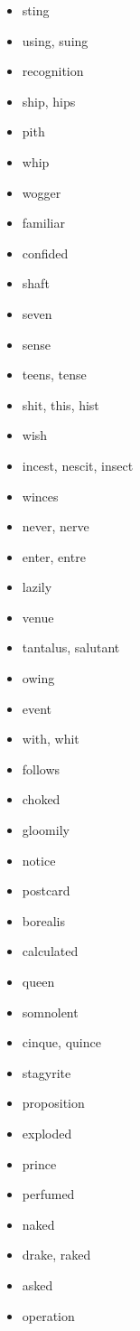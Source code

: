 \documentclass{article}
\begin{document}
\begin{itemize}
    \item sting
    \item using, suing
    \item recognition
    \item ship, hips
    \item pith
    \item whip
    \item wogger
    \item familiar
    \item confided
    \item shaft
    \item seven
    \item sense
    \item teens, tense
    \item shit, this, hist
    \item wish
    \item incest, nescit, insect
    \item winces
    \item never, nerve
    \item enter, entre
    \item lazily
    \item venue
    \item tantalus, salutant
    \item owing
    \item event
    \item with, whit
    \item follows
    \item choked
    \item gloomily
    \item notice
    \item postcard
    \item borealis
    \item calculated
    \item queen
    \item somnolent
    \item cinque, quince
    \item stagyrite
    \item proposition
    \item exploded
    \item prince
    \item perfumed
    \item naked
    \item drake, raked
    \item asked
    \item operation

\end{itemize}
\end{document}
